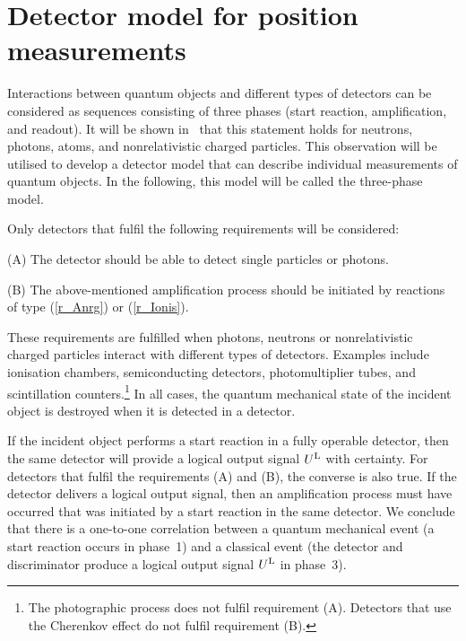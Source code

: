 \documentclass[11pt,a4paper]{article}
\begin{document}

\section{Detector model for position measurements}\label{ch_det-mod} 

Interactions between quantum objects and different types of detectors can be considered as sequences consisting of three phases (start reaction, amplification, and readout).  It will be shown in~\cite{Wick} that this statement holds for neutrons, photons, atoms, and nonrelativistic charged particles.  
This observation will be utilised to develop a detector model that can describe individual measurements of quantum objects.  
In the following, this model will be called the three-phase model.  

Only detectors that fulfil the following requirements will be considered:  

(A) The detector should be able to detect single particles or photons.  

(B) The above-mentioned amplification process should be initiated by reactions of type (\ref{r_Anrg}) or (\ref{r_Ionis}).  

These requirements are fulfilled when photons, neutrons or nonrelativistic charged particles interact with different types of detectors.  
Examples include ionisation chambers, semiconducting detectors, photomultiplier tubes, and scintillation counters.\footnote{The photographic process does not fulfil requirement (A).  Detectors that use the Cherenkov effect do not fulfil requirement (B).} In all cases, the quantum mechanical state of the incident object is destroyed when it is detected in a detector.  

If the incident object performs a start reaction in a fully operable detector, then the same detector will provide a logical output signal $U^{\rm L}$ with certainty. For detectors that fulfil the requirements (A) and (B), the converse is also true.  
If the detector delivers a logical output signal, then an amplification process must have occurred that was initiated by a start reaction in the same detector.  
We conclude that there is a one-to-one correlation between a quantum mechanical event (a start reaction occurs in phase~1) and a classical event (the detector and discriminator produce a logical output signal $U^{\rm L}$ in phase~3).  
\end{document}
